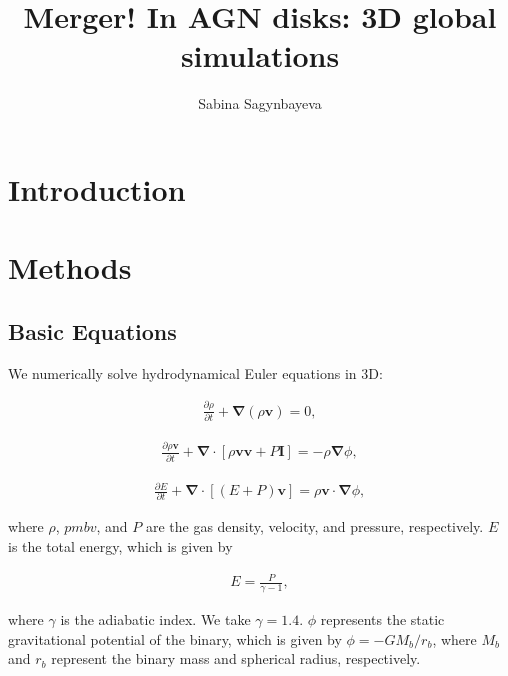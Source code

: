 \documentclass[twocolumn]{aastex631}
\begin{document}
\title{Merger! In AGN disks: 3D global simulations}

\author[0000-0002-6650-3829]{Sabina Sagynbayeva}


\begin{abstract}
   
\end{abstract}

\section{Introduction} 
\label{sec:intro}

\section{Methods}
\label{sec:methods}
\subsection{Basic Equations}
We numerically solve hydrodynamical Euler equations in 3D:
%
\begin{linenomath}\begin{align}
    \label{eq:continuity}
    \frac{\partial\rho}{\partial t} + \pmb{\nabla}(\rho \pmb{v}) = 0,
\end{align}\end{linenomath}
%
%
\begin{linenomath}\begin{align}
    \label{eq:momentum}
    \frac{\partial\rho\pmb{v}}{\partial t} + \pmb{\nabla}\cdot\left[\rho\pmb{vv}+P\pmb{I}\right] = -\rho\pmb{\nabla}\phi,
\end{align}\end{linenomath}
%
%
\begin{linenomath}\begin{align}
    \label{eq:energy}
    \frac{\partial E}{\partial t} + \pmb{\nabla}\cdot\left[\left(E+P\right)\pmb{v}\right] = \rho\pmb{v}\cdot\pmb{\nabla}\phi,
\end{align}\end{linenomath}
%
where $\rho$, $pmb{v}$, and $P$ are the gas density, velocity, and pressure, respectively. $E$ is the total energy, which is given by
%
\begin{linenomath}\begin{align}
    \label{eq:totalenergy}
    E = \frac{P}{\gamma-1},
\end{align}\end{linenomath}
%
where $\gamma$ is the adiabatic index. We take $\gamma=1.4$. $\phi$ represents the static gravitational potential of the binary, which is given by
$\phi=-GM_b/r_b$, where $M_b$ and $r_b$ represent the binary mass and spherical radius, respectively.
\end{document}
